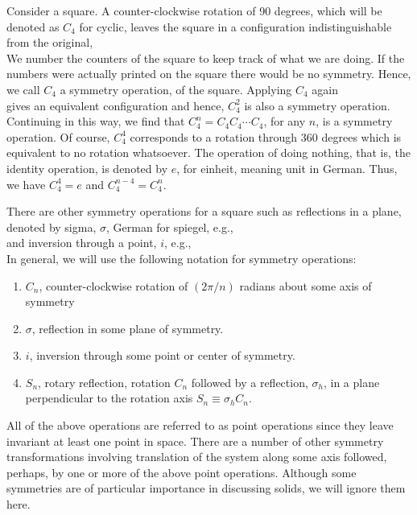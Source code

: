 Consider a square.  A counter-clockwise rotation of 90 degrees, which 
will be denoted as $C_4$ for cyclic, leaves the square in a 
configuration indistinguishable from the original,
\begin{equation}
\end{equation}
We number the counters of the square to keep track of what we are 
doing.  If the numbers were actually printed on the square there would 
be no symmetry.  Hence, we call $C_4$ a symmetry operation, of the 
square.  Applying $C_4$ again
\begin{equation}
\end{equation}
gives an equivalent configuration and hence, $C^2_4$ is also a 
symmetry operation.  Continuing in this way, we find that $C^n_4 = C_4 
C_4 \cdots C_4$, for any $n$, is a symmetry operation.  Of course, 
$C^4_4$ corresponds to a rotation through 360 degrees which is 
equivalent to no rotation whatsoever.  The operation of doing nothing, 
that is, the identity operation, is denoted by $e$, for einheit, 
meaning unit in German.  Thus, we have $C^4_4 = e$ and $C_4^{n-4} = 
C^n_4$.  

There are other symmetry operations for a square such as reflections in 
a plane, denoted by sigma, $\sigma$, German for spiegel, e.g.,
\begin{equation}
\end{equation}
and inversion through a point, $i$, e.g.,
\begin{equation}
\end{equation}
In general, we will use the following notation for symmetry
operations:
\begin{enumerate}
\item $C_n$, counter-clockwise rotation of $(2 \pi / n)$ 
radians about some axis of symmetry
\item $\sigma$, reflection in some plane of symmetry.
\item $i$, inversion through some point or center of symmetry.
\item $S_n$, rotary reflection, rotation $C_n$ followed by a 
reflection, $\sigma_h$, in a plane perpendicular to the rotation 
axis $S_n \equiv \sigma_h C_n$.
\end{enumerate}
All of the above operations are referred to as point operations since 
they leave invariant at least one point in space.  There are a number 
of other symmetry transformations involving translation of the system 
along some axis followed, perhaps, by one or more of the above point 
operations.  Although some symmetries are of particular importance in 
discussing solids, we will ignore them here.

